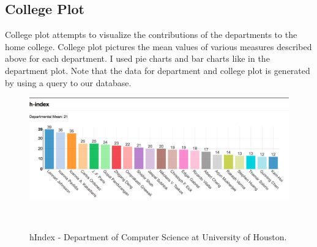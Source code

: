\subsection{College Plot}

College plot attempts to visualize the contributions of the departments to the home college. College plot pictures the mean values of various measures described above for each department. I used pie charts and bar charts like in the department plot. Note that the data for department and college plot is generated by using a query to our database.


\begin{figure}
  \centering
  \includegraphics[width=1\textwidth]{figures/Dept-h-HD}
  \caption{hIndex - Department of Computer Science at University of Houston.}~\label{fig:DP-College1}
\end{figure}

